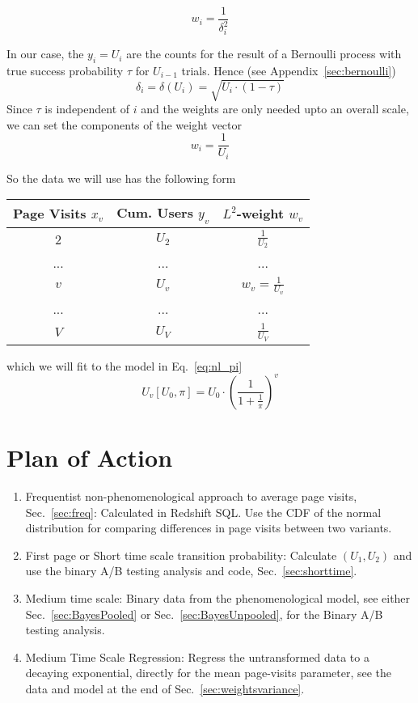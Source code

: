 \documentclass[12pt]{report}
\newcommand{\be}{\begin{enumerate}} %
\newcommand{\ee}{\end{enumerate}} %
\newcommand{\beq}{\begin{equation}} %
\newcommand{\eeq}{\end{equation}} %
\newcommand{\bdm}{\begin{displaymath}} %
\newcommand{\edm}{\end{displaymath}} %
\begin{document}
\beq\label{eq:weightsvariance}
w_i = \frac1{\delta^2_i}
\eeq

In our case, the \(y_i = U_i\) are the counts for the result of a
Bernoulli process with true success probability \(\tau\) for
\(U_{i-1}\) trials. Hence (see Appendix~\ref{sec:bernoulli})
\beq\label{eq:bernerror}
\delta_i = \delta(U_i) = \sqrt{U_i\cdot(1-\tau)}
\eeq
Since \(\tau\) is independent of \(i\) and the weights are only needed
upto an overall scale, we can set the components of the weight vector
\beq\label{eq:weights}
w_i = \frac1{U_i}
\eeq

So the data we will use has the following form
\begin{center}\label{table:data}
\begin{tabular}{ |c|c|c| } 
 \hline
 Page Visits \(x_v\) & Cum. Users \(y_v\) & \(L^2\)-weight \(w_v\)\\
 \hline
 2 & \(U_2\) & \(\frac1{U_2}\) \\
 ... & ... & ... \\ 
 \(v\) & \(U_v\) & \(w_v = \frac1{U_v}\) \\ 
 ... & ... & ... \\
 \(V\) &\(U_V\) & \(\frac1{U_V}\) \\
 \hline
\end{tabular}
\end{center}
which we will fit to the model in Eq.~\ref{eq:nl_pi}
\bdm
U_v[U_0,\pi]=U_0\cdot \left(\frac{1}{1+\frac{1}{\pi}}\right)^v
\edm


\section{Plan of Action}
\be
\item Frequentist non-phenomenological approach to average page
  visits, Sec.~\ref{sec:freq}: Calculated in Redshift SQL. Use the CDF
  of the normal distribution for comparing differences in page visits
  between two variants.
\item First page or Short time scale transition probability: Calculate
  \((U_1, U_2)\) and use the binary A/B testing analysis and code,
  Sec.~\ref{sec:shorttime}. 
\item Medium time scale: Binary data from the phenomenological model,
  see either Sec.~\ref{sec:BayesPooled} or
  Sec.~\ref{sec:BayesUnpooled}, for the Binary A/B testing analysis.
\item Medium Time Scale Regression: Regress the untransformed data to
  a decaying exponential, directly for the mean page-visits parameter,
  see the data and model at the end of Sec.~\ref{sec:weightsvariance}.
\ee
  
\end{document}
